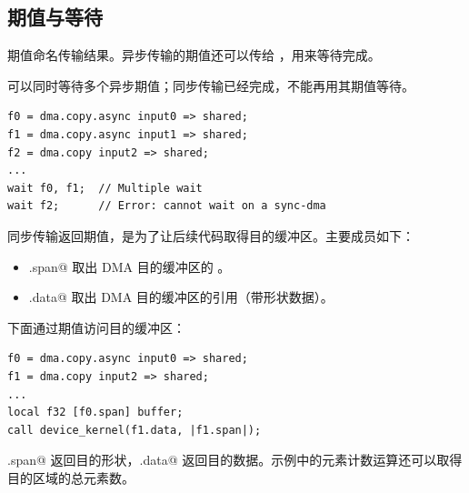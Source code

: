 \subsection*{期值与等待}

期值命名传输结果。异步传输的期值还可以传给 \co@wait@，用来等待完成。

\co@wait@ 可以同时等待多个异步期值；同步传输已经完成，不能再用其期值等待。

\begin{lstlisting}[language=croqtile,caption={同步与异步期值的等待}]
f0 = dma.copy.async input0 => shared;
f1 = dma.copy.async input1 => shared;
f2 = dma.copy input2 => shared;
...
wait f0, f1;  // Multiple wait
wait f2;      // Error: cannot wait on a sync-dma
\end{lstlisting}

同步传输返回期值，是为了让后续代码取得目的缓冲区。主要成员如下：

\begin{itemize}[leftmargin=1.6em]
\item \co@.span@ 取出 DMA 目的缓冲区的 \co@mdspan@。
\item \co@.data@ 取出 DMA 目的缓冲区的引用（带形状数据）。
\end{itemize}

下面通过期值访问目的缓冲区：

\begin{lstlisting}[language=croqtile,caption={通过期值访问数据与形状}]
f0 = dma.copy.async input0 => shared;
f1 = dma.copy input2 => shared;
...
local f32 [f0.span] buffer;
call device_kernel(f1.data, |f1.span|);
\end{lstlisting}

\co@.span@ 返回目的形状，\co@.data@ 返回目的数据。示例中的元素计数运算还可以取得目的区域的总元素数。

